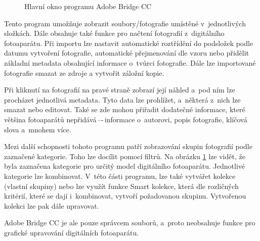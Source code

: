 \begin{figure}[h!]
\begin{center}
\caption{Hlavní okno programu Adobe Bridge CC}
\label{adobe_b}
\end{center}
\end{figure}

Tento program umožňuje zobrazit soubory/fotografie umístěné v~jednotlivých složkách. Dále obsahuje také funkce pro načtení fotografií z~digitálního fotoaparátu. Při importu lze nastavit automatické roztřídění do podsložek podle datumu vytvoření fotografie, automatické přejmenování dle vzoru nebo přidělit základní metadata obsahující informace o~tvůrci fotografie. Dále lze importované fotografie smazat ze zdroje a vytvořit záložní kopie.

Při kliknutí na fotografií na pravé straně zobrazí její náhled a~pod ním lze procházet jednotlivá metadata. Tyto data lze prohlížet, a~některá z~nich lze smazat nebo editovat. Také se zde mohou přiřadit dodatečné informace, které většina fotoaparátů nepřidává\,–-\,informace o~autorovi, popis fotografie, klíčová slova a~mnohem více.

Mezi další schopnosti tohoto programu patří zobrazování skupin fotografií podle zaznačené kategorie.  Toho lze docílit pomocí filtrů. Na obrázku \ref{adobe_b} lze vidět, že byla zaznačena kategorie pro určitý model digitálního fotoaparátu. Jednotlivé kategorie lze kombinovat.
V~této části programu, lze také vytvářet kolekce (vlastní skupiny) nebo lze využít funkce Smart kolekce, která dle rozličných kritérií, které se dají i~kombinovat, vytvoří požadovanou skupinu. Vytvořenou kolekci lze pak dále upravovat.

Adobe Bridge CC je ale pouze správcem souborů, a~proto neobsahuje funkce pro grafické upravování digitálních fotoaparátu.

